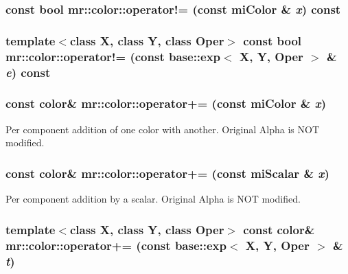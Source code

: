 \subsubsection{\setlength{\rightskip}{0pt plus 5cm}const bool mr::color::operator!= (const mi\-Color \& {\em x}) const\hspace{0.3cm}{\tt  [inline]}}\label{structmr_1_1color_z10_4}


\subsubsection{\setlength{\rightskip}{0pt plus 5cm}template$<$class X, class Y, class Oper$>$ const bool mr::color::operator!= (const {\bf base::exp}$<$ X, Y, Oper $>$ \& {\em e}) const\hspace{0.3cm}{\tt  [inline]}}\label{structmr_1_1color_z10_3}


\subsubsection{\setlength{\rightskip}{0pt plus 5cm}const {\bf color}\& mr::color::operator+= (const mi\-Color \& {\em x})\hspace{0.3cm}{\tt  [inline]}}\label{structmr_1_1color_z14_3}


Per component addition of one color with another. Original Alpha is NOT modified. 
\subsubsection{\setlength{\rightskip}{0pt plus 5cm}const {\bf color}\& mr::color::operator+= (const mi\-Scalar \& {\em x})\hspace{0.3cm}{\tt  [inline]}}\label{structmr_1_1color_z14_2}


Per component addition by a scalar. Original Alpha is NOT modified. 
\subsubsection{\setlength{\rightskip}{0pt plus 5cm}template$<$class X, class Y, class Oper$>$ const {\bf color}\& mr::color::operator+= (const {\bf base::exp}$<$ X, Y, Oper $>$ \& {\em t})\hspace{0.3cm}{\tt  [inline]}}\label{structmr_1_1color_z14_1}


